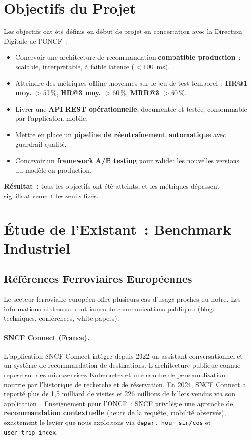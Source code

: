 \documentclass[12pt, a4paper]{report}
\begin{document}
\section{Objectifs du Projet}

Les objectifs ont été définis en début de projet en concertation avec la
Direction Digitale de l'ONCF~:

\begin{itemize}
\item[\checkmark] Concevoir une architecture de recommandation
    \textbf{compatible production}~: scalable, interprétable, à faible
    latence ($< 100$~ms).
\item[\checkmark] Atteindre des métriques offline moyennes sur le jeu de
    test temporel~: \textbf{HR@1 moy. $> 50\,\%$}, \textbf{HR@3 moy. $> 60\,\%$},
    \textbf{MRR@3 $> 60\,\%$}.
\item[\checkmark] Livrer une \textbf{API REST opérationnelle}, documentée
    et testée, consommable par l'application mobile.
\item[\checkmark] Mettre en place un \textbf{pipeline de réentraînement
    automatique} avec guardrail qualité.
\item[\checkmark] Concevoir un \textbf{framework A/B testing} pour valider
    les nouvelles versions du modèle en production.
\end{itemize}

\textbf{Résultat~:} tous les objectifs ont été atteints, et les métriques
dépassent significativement les seuils fixés.

\section{Étude de l'Existant~: Benchmark Industriel}

\subsection{Références Ferroviaires Européennes}

Le secteur ferroviaire européen offre plusieurs cas d'usage proches du
notre. Les informations ci-dessous sont issues de communications
publiques (blogs techniques, conférences, white-papers).

\paragraph{SNCF Connect (France).} L'application SNCF Connect intègre
depuis 2022 un assistant conversationnel et un système de
recommandation de destinations. L'architecture publique connue repose
sur des microservices Kubernetes et une couche de personnalisation
nourrie par l'historique de recherche et de réservation. En 2024,
SNCF Connect a reporté plus de 1{,}5 milliard de visites et 226 millions
de billets vendus via son application~\cite{sncf-connect}. Enseignement
pour l'ONCF~: SNCF privilégie une approche de \textbf{recommandation
contextuelle} (heure de la requête, mobilité observée), exactement le
levier que nous exploitons via \texttt{depart\_hour\_sin/cos} et
\texttt{user\_trip\_index}.
\end{document}

